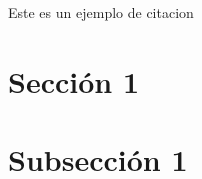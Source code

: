 \begin{intro}


Este es un ejemplo de citacion \cite{clay_2009}
\section*{Secci\'on 1}
%


\section*{Subsecci\'on 1}
%


\end{intro}
